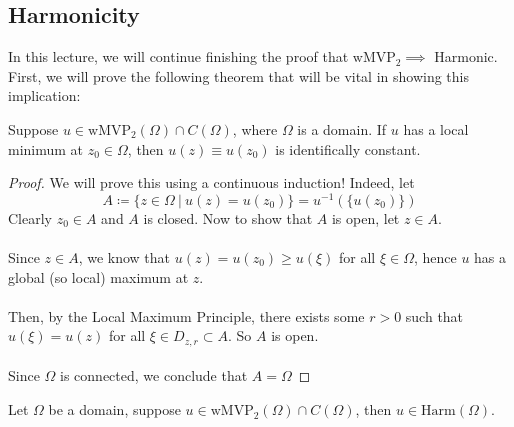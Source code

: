 \documentclass{article}
\begin{document}
\subsection{Harmonicity}

In this lecture, we will continue finishing the proof that $\text{wMVP}_2 \implies $ Harmonic. First, we will prove the following theorem that will be vital in showing this implication:

\begin{theorem}
Suppose $u \in \text{wMVP}_2(\Omega) \cap C(\Omega)$, where $\Omega$ is a domain. If $u$ has a local minimum at $z_0 \in \Omega$, then $u(z) \equiv u(z_0)$ is identifically constant.
\end{theorem}

\begin{proof}
    We will prove this using a continuous induction! Indeed, let
    \[A \coloneqq \{z \in \Omega\ |\ u(z) = u(z_0)\} = u^{-1}(\{u(z_0)\})\]
    Clearly $z_0 \in A$ and $A$ is closed. Now to show that $A$ is open, let $z \in A$.\\\\
    Since $z \in A$, we know that $u(z) = u(z_0) \geq u(\xi)$ for all $\xi \in \Omega$, hence $u$ has a global (so local) maximum at $z$.\\\\
    Then, by the Local Maximum Principle, there exists some $r > 0$ such that $u(\xi) = u(z)$ for all $\xi \in D_{z, r} \subset A$. So $A$ is open.\\\\
    Since $\Omega$ is connected, we conclude that $A = \Omega$
\end{proof}

\begin{theorem}
    Let $\Omega$ be a domain, suppose $u \in \text{wMVP}_2(\Omega) \cap C(\Omega)$, then $u \in \text{Harm}(\Omega)$. 
\end{theorem}
\end{document}

